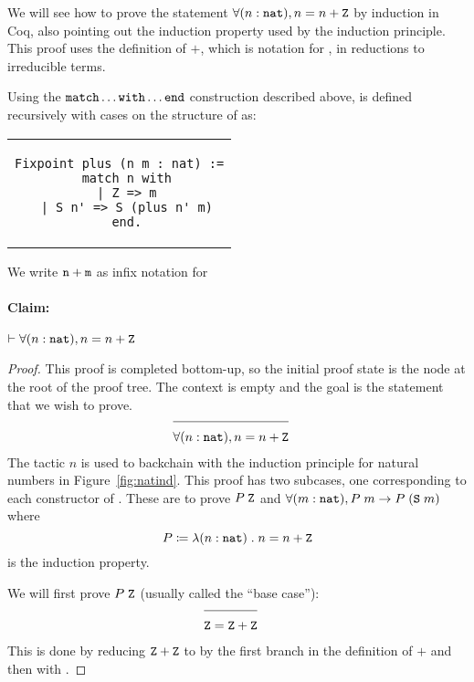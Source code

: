 \begin{expl}

We will see how to prove the statement $\forall (n : \texttt{nat}), n = n + \texttt{Z}$ by induction in Coq, also pointing out the induction property used by the induction principle. This proof uses the definition of $+$, which is notation for , in reductions to irreducible terms.

Using the $\texttt{match} \ldots \texttt{with} \ldots \texttt{end}$ construction described above,  is defined recursively with cases on the structure of  as:
\begin{center}
\begin{tabular}{c}
\begin{lstlisting}
Fixpoint plus (n m : nat) :=
  match n with
  | Z => m
  | S n' => S (plus n' m)
  end.
\end{lstlisting}
\end{tabular}
\end{center}
We write $\texttt{n} + \texttt{m}$ as infix notation for 

\paragraph{Claim:} $\vdash \forall (n : \texttt{nat}), n = n + \texttt{Z}$ \\

\begin{proof}

This proof is completed bottom-up, so the initial proof state is the node at the root of the proof tree. The context is empty and the goal is the statement that we wish to prove.
\begin{align*}
\cline{1-2}
& \forall (n : \coqtm{nat}), n = n + \coqtm{Z}
\end{align*}
The tactic  $n$ is used to backchain with the induction principle for natural numbers in Figure~\ref{fig:natind}. This proof has two subcases, one corresponding to each constructor of . These are to prove $P \; \texttt{Z}$ and $\forall (m : \texttt{nat}), P \; m \rightarrow P \; (\texttt{S} \; m)$ where
$$
P \coloneqq \lambda (n : \texttt{nat}) \; . \; n = n + \texttt{Z}
$$
is the induction property.

We will first prove $P \; \texttt{Z}$ (usually called the ``base case''):
\begin{align*}
\cline{1-2}
& \coqtm{Z} = \coqtm{Z} + \coqtm{Z}
\end{align*}
This is done by reducing $\texttt{Z} + \texttt{Z}$ to  by the first branch in the definition of $+$ and then with .


\end{proof}
\end{expl}
